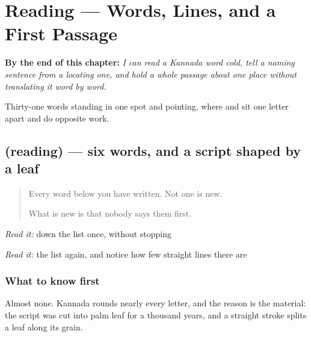 
\chapter{Reading — Words, Lines, and a First Passage}
\label{ch:ka-modala-oduvike}

\begin{chapteropening}
\textbf{By the end of this chapter:} \emph{I can read a Kannada word cold, tell a naming sentence from a locating one, and hold a whole passage about one place without translating it word by word.}

Thirty-one words standing in one spot and pointing, where  and  sit one letter apart and do opposite work.
\end{chapteropening}

\section[(reading)]{(reading) — six words, and a script shaped by a leaf}

\label{lesson:KA-C76-words}



\begin{quote}
Every word below you have written. Not one is new.

What is new is that nobody says them first.
\end{quote}

\begin{tcolorbox}[breakable,skin=enhanced,colback=orange!6,colframe=orange!45!black,boxrule=0.5pt,arc=1mm,left=6pt,right=6pt,top=4pt,bottom=4pt,fonttitle=\bfseries,title={Read this}]
\begin{quote}
     
\end{quote}

\emph{Read it:} down the list once, without stopping

\emph{Read it:} the list again, and notice how few straight lines there are
\end{tcolorbox}

\subsection*{What to know first}
Almost none. Kannada rounds nearly every letter, and the reason is the material: the script was cut into palm leaf for a thousand years, and a straight stroke splits a leaf along its grain.

